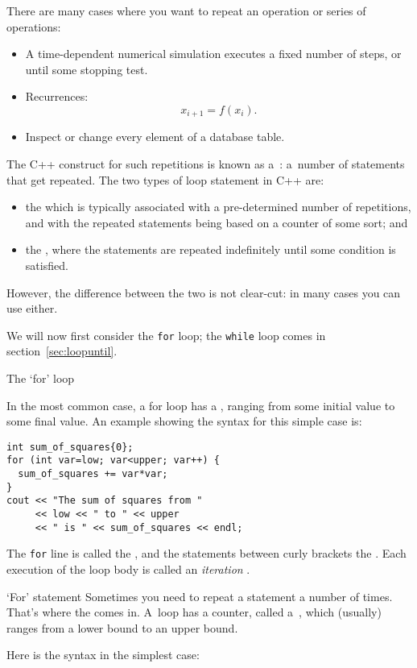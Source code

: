 
There are many cases where you want to repeat an operation or series
of operations:
\begin{itemize}
\item A time-dependent numerical simulation executes a fixed number of
  steps, or until some stopping test.
\item Recurrences: \[ x_{i+1} = f(x_i). \]
\item Inspect or change every element of a database table.
\end{itemize}


The C++ construct for such repetitions
is known as a~: a~number of
statements that get repeated. The two types of loop statement in C++ are:
\begin{itemize}
\item the  which is typically associated with
  a pre-determined number of repetitions, and with the repeated
  statements being based on a counter of some sort; and
\item the , where the statements are
  repeated indefinitely until some condition is satisfied.
\end{itemize}
However, the difference between the two is not clear-cut: in many
cases you can use either.

We will now first consider the \lstinline{for} loop; the \lstinline{while} loop comes in
section~\ref{sec:loopuntil}.

 {The `for' loop}
\label{sec:for}

In the most common case, a for loop has a
, ranging from some initial value to some 
final value. An example showing the syntax for this simple case is:
\begin{lstlisting}
int sum_of_squares{0};
for (int var=low; var<upper; var++) {
  sum_of_squares += var*var;
}
cout << "The sum of squares from "
     << low << " to " << upper
     << " is " << sum_of_squares << endl;
\end{lstlisting}
The \lstinline{for} line is called the , and the
statements between curly brackets the .
Each execution of the loop body is called an
%
\emph{iteration}%
%
%
.
\begin{slide}{`For' statement}
  \label{sl:for}
  Sometimes you need to repeat a statement a number of times. That's
  where the  comes in. A~loop has a counter, called
  a~, which (usually) ranges from a lower bound
  to an upper bound.

  Here is the syntax in the simplest case:
\end{slide}

